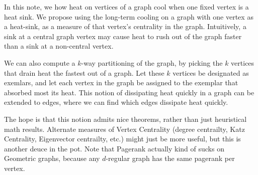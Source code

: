 In this note, we how heat on vertices of a graph cool when
one fixed vertex is a heat sink.
We propose using the long-term cooling on a graph with one vertex
as a heat-sink, as a measure
of that vertex's centrality in the graph.
Intuitively, a sink at a central graph
vertex may cause heat to rush
out of the graph faster than a sink at a non-central
vertex.

We can also compute a $k$-way
partitioning of the graph, by picking the $k$ vertices that drain
heat the fastest out of a graph. Let these $k$ vertices be
designated as exemlars, and let
each vertex in the graph be assigned to the
exemplar that absorbed most its heat.
This notion of dissipating heat quickly in a graph can be
extended to edges, where we can find which edges dissipate heat
quickly. 

The hope is that this notion admits nice theorems, rather than
just heuristical math results. Alternate measures of Vertex
Centrality (degree centrailty, Katz Centrality, Eigenvector
    centrailty, etc.) might just be more useful, but this is
another deuce in the pot. Note that Pagerank actually kind of
sucks on Geometric graphs, because any $d$-regular graph has the
same pagerank per vertex.

